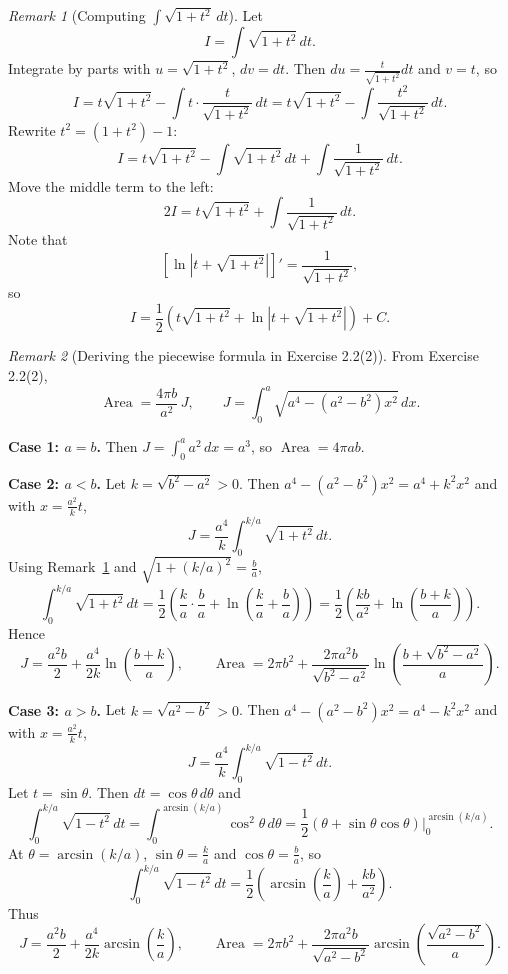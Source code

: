\documentclass[11pt]{article}
\theoremstyle{definition}
\theoremstyle{remark}
\newtheorem{remark}{Remark}[section]
\DeclareMathOperator{\Area}{Area}
\begin{document}
\begin{remark}[Computing $\int \sqrt{1+t^2}\,dt$]
\label{rem:int-sqrt}
Let
\[
I=\int \sqrt{1+t^2}\,dt.
\]
Integrate by parts with $u=\sqrt{1+t^2}$, $dv=dt$. Then $du=\frac{t}{\sqrt{1+t^2}}dt$ and $v=t$, so
\[
I=t\sqrt{1+t^2}-\int t\cdot \frac{t}{\sqrt{1+t^2}}\,dt
=t\sqrt{1+t^2}-\int \frac{t^2}{\sqrt{1+t^2}}\,dt.
\]
Rewrite $t^2=(1+t^2)-1$:
\[
I=t\sqrt{1+t^2}-\int \sqrt{1+t^2}\,dt+\int \frac{1}{\sqrt{1+t^2}}\,dt.
\]
Move the middle term to the left:
\[
2I=t\sqrt{1+t^2}+\int \frac{1}{\sqrt{1+t^2}}\,dt.
\]
Note that
\[
\left[\ln\left|t+\sqrt{1+t^2}\right|\right]'=\frac{1}{\sqrt{1+t^2}},
\]
so
\[
I=\frac{1}{2}\left(t\sqrt{1+t^2}+\ln\left|t+\sqrt{1+t^2}\right|\right)+C.
\]
\end{remark}

\begin{remark}[Deriving the piecewise formula in Exercise 2.2(2)]
\label{rem:ellipse-area}
From Exercise 2.2(2),
\[
\Area=\frac{4\pi b}{a^2}\,J,
\qquad
J=\int_{0}^{a}\sqrt{a^4-(a^2-b^2)x^2}\,dx.
\]

\textbf{Case 1: $a=b$.} Then $J=\int_0^a a^2\,dx=a^3$, so $\Area=4\pi ab$.

\textbf{Case 2: $a<b$.} Let $k=\sqrt{b^2-a^2}>0$. Then $a^4-(a^2-b^2)x^2=a^4+k^2x^2$ and with $x=\frac{a^2}{k}t$,
\[
J=\frac{a^4}{k}\int_{0}^{k/a}\sqrt{1+t^2}\,dt.
\]
Using Remark~\ref{rem:int-sqrt} and $\sqrt{1+(k/a)^2}=\frac{b}{a}$,
\[
\int_{0}^{k/a}\sqrt{1+t^2}\,dt
=\frac{1}{2}\left(\frac{k}{a}\cdot\frac{b}{a}+\ln\left(\frac{k}{a}+\frac{b}{a}\right)\right)
=\frac{1}{2}\left(\frac{kb}{a^2}+\ln\left(\frac{b+k}{a}\right)\right).
\]
Hence
\[
J=\frac{a^2b}{2}+\frac{a^4}{2k}\ln\left(\frac{b+k}{a}\right),
\qquad
\Area=2\pi b^2+\frac{2\pi a^2b}{\sqrt{b^2-a^2}}\ln\left(\frac{b+\sqrt{b^2-a^2}}{a}\right).
\]

\textbf{Case 3: $a>b$.} Let $k=\sqrt{a^2-b^2}>0$. Then $a^4-(a^2-b^2)x^2=a^4-k^2x^2$ and with $x=\frac{a^2}{k}t$,
\[
J=\frac{a^4}{k}\int_{0}^{k/a}\sqrt{1-t^2}\,dt.
\]
Let $t=\sin\theta$. Then $dt=\cos\theta\,d\theta$ and
\[
\int_{0}^{k/a}\sqrt{1-t^2}\,dt=\int_{0}^{\arcsin(k/a)}\cos^2\theta\,d\theta
=\frac{1}{2}\left(\theta+\sin\theta\cos\theta\right)\Big|_{0}^{\arcsin(k/a)}.
\]
At $\theta=\arcsin(k/a)$, $\sin\theta=\frac{k}{a}$ and $\cos\theta=\frac{b}{a}$, so
\[
\int_{0}^{k/a}\sqrt{1-t^2}\,dt=\frac{1}{2}\left(\arcsin\left(\frac{k}{a}\right)+\frac{kb}{a^2}\right).
\]
Thus
\[
J=\frac{a^2b}{2}+\frac{a^4}{2k}\arcsin\left(\frac{k}{a}\right),
\qquad
\Area=2\pi b^2+\frac{2\pi a^2b}{\sqrt{a^2-b^2}}\arcsin\left(\frac{\sqrt{a^2-b^2}}{a}\right).
\]
\end{remark}
\end{document}
